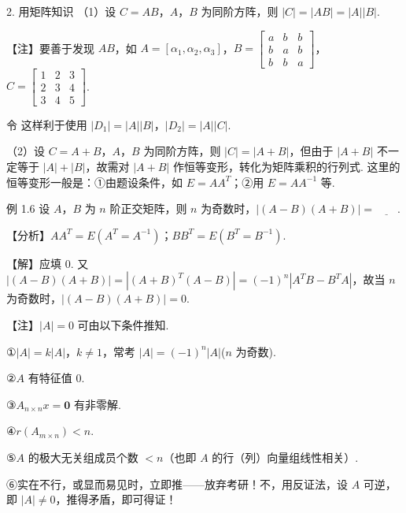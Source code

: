 \begin{fcard}{2. 用矩阵知识}
（1）设 $C=AB$，$A$，$B$ 为同阶方阵，则 $|C|=|AB|=|A||B|$.
\end{fcard}

\begin{fnote}
【注】要善于发现 $AB$，如 $A=[\alpha_1,\alpha_2,\alpha_3]$，$B=\begin{bmatrix}a & b & b\\ b & a & b\\ b & b & a\end{bmatrix}$，$C=\begin{bmatrix}1 & 2 & 3\\ 2 & 3 & 4\\ 3 & 4 & 5\end{bmatrix}$.

令
这样利于使用 $|D_1|=|A||B|$，$|D_2|=|A||C|$.
\end{fnote}

（2）设 $C=A+B$，$A$，$B$ 为同阶方阵，则 $|C|=|A+B|$，但由于 $|A+B|$ 不一定等于 $|A|+|B|$，故需对 $|A+B|$ 作恒等变形，转化为矩阵乘积的行列式. 这里的恒等变形一般是：①由题设条件，如 $E=AA^{T}$；②用 $E=AA^{-1}$ 等.

\begin{fcard}{例 1.6}
设 $A$，$B$ 为 $n$ 阶正交矩阵，则 $n$ 为奇数时，$|(A-B)(A+B)|=\underline{\qquad}$.

【分析】$AA^{T}=E(A^{T}=A^{-1})$；$BB^{T}=E(B^{T}=B^{-1})$.

【解】应填 0.
又 $|(A-B)(A+B)|=|(A+B)^{T}(A-B)|=(-1)^{n}|A^{T}B-B^{T}A|$，故当 $n$ 为奇数时，$|(A-B)(A+B)|=0$.
\end{fcard}

\begin{fnote}
【注】$|A|=0$ 可由以下条件推知.

①$|A|=k|A|$，$k\neq 1$，常考 $|A|=(-1)^{n}|A|$($n$ 为奇数).

②$A$ 有特征值 0.

③$A_{n\times n}x=\mathbf{0}$ 有非零解.

④$r(A_{m\times n})<n$.

⑤$A$ 的极大无关组成员个数 $<n$（也即 $A$ 的行（列）向量组线性相关）.

⑥实在不行，或显而易见时，立即推——放弃考研！不，用反证法，设 $A$ 可逆，即 $|A|\neq 0$，推得矛盾，即可得证！
\end{fnote}

